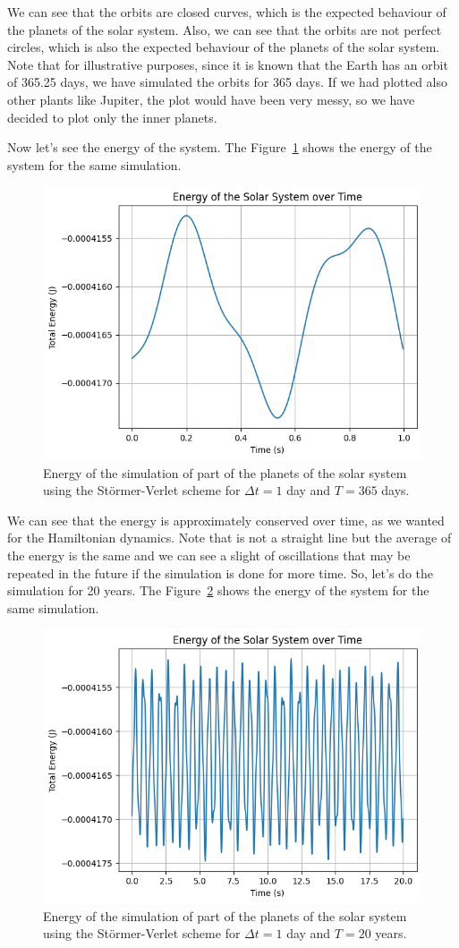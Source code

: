 \documentclass{article}
\begin{document}
We can see that the orbits are closed curves, which is the expected behaviour of the planets of the solar system. Also, we can see that the orbits are not perfect circles, which is also the expected behaviour of the planets of the solar system. Note that for illustrative purposes, since it is known that the Earth has an orbit of 365.25 days, we have simulated the orbits for 365 days. If we had plotted also other plants like Jupiter, the plot would have been very messy, so we have decided to plot only the inner planets.

Now let's see the energy of the system. The Figure~\ref{fig:solarsystemenergy1} shows the energy of the system for the same simulation.

\begin{figure}[H]
	\centering
	\includegraphics[width=0.5\linewidth]{./Figures/SolarSystem/energy1.png}
	\caption{Energy of the simulation of part of the planets of the solar system using the Störmer-Verlet scheme for \(\Delta t = 1\) day and \(T = 365\) days.}
	\label{fig:solarsystemenergy1}
\end{figure}

We can see that the energy is approximately conserved over time, as we wanted for the Hamiltonian dynamics. Note that is not a straight line but the average of the energy is the same and we can see a slight of oscillations that may be repeated in the future if the simulation is done for more time. So, let's do the simulation for 20 years. The Figure~\ref{fig:solarsystemenergy2} shows the energy of the system for the same simulation.

\begin{figure}[H]
	\centering
	\includegraphics[width=0.5\linewidth]{./Figures/SolarSystem/energy2.png}
	\caption{Energy of the simulation of part of the planets of the solar system using the Störmer-Verlet scheme for \(\Delta t = 1\) day and \(T = 20\) years.}
	\label{fig:solarsystemenergy2}
\end{figure}
\end{document}
